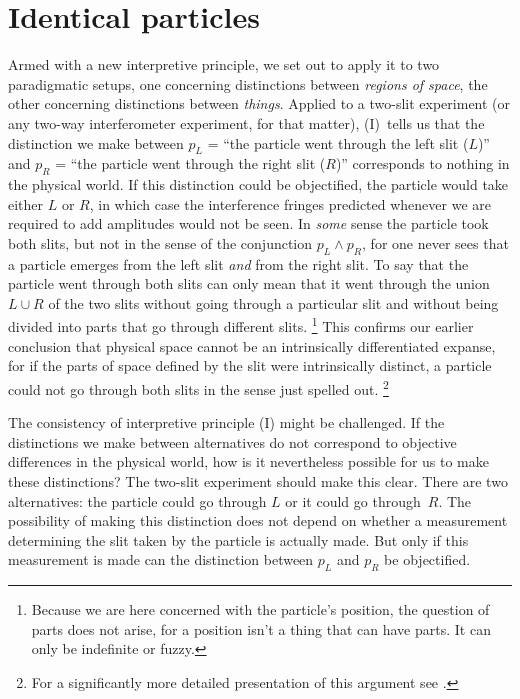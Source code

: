 \section{Identical particles}\label{sec:idpas}
Armed with a new interpretive principle, we set out to apply it to two paradigmatic setups, one concerning distinctions between \emph{regions of space}, the other concerning distinctions between \emph{things}. Applied to a two-slit experiment (or any two-way interferometer experiment, for that matter), (I)~tells us that the distinction we make between $p_L$ = ``the particle went through the left slit ($L$)'' and $p_R$ = ``the particle went through the right slit ($R$)'' corresponds to nothing in the physical world. If this distinction could be objectified, the particle would take either $L$ or $R$, in which case the interference fringes predicted whenever we are required to add amplitudes would not be seen. In \emph{some} sense the particle took both slits, but not in the sense of the conjunction $p_L\wedge p_R$, for one never sees that a particle emerges from the left slit \emph{and} from the right slit. To say that the particle went through both slits can only mean that it went through the union $L\cup R$ of the two slits without going through a particular slit and without being divided into parts that go through different slits.%
\footnote{Because we are here concerned with the particle's position, the question of parts does not arise, for a position isn't a thing that can have parts. It can only be indefinite or fuzzy.}
This confirms our earlier conclusion that physical space cannot be an intrinsically differentiated expanse, for if the parts of space defined by the slit were intrinsically distinct, a particle could not go through both slits in the sense just spelled out.%
\footnote{For a significantly more detailed presentation of this argument see \citep[Sec.~4]{Mohrhoff2014}.}

The consistency of interpretive principle (I) might be challenged. If the distinctions we make between alternatives do not correspond to objective differences in the physical world, how is it nevertheless possible for us to make these distinctions? The two-slit experiment should make this clear. There are two alternatives: the particle could go through $L$ or it could go through~$R$. The possibility of making this distinction does not depend on whether a measurement determining the slit taken by the particle is actually made. But only if this measurement is made can the distinction between $p_L$ and $p_R$ be objectified.


